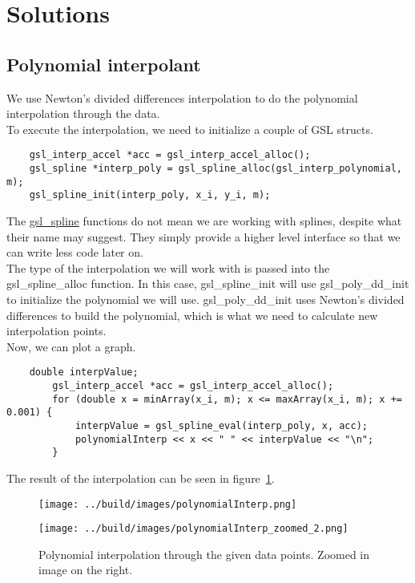 \documentclass[11pt, a4paper, titlepage, openright]{article}
\begin{document}
\section{Solutions}

\subsection{Polynomial interpolant}
\label{sec:firstpoly}
    We use Newton's divided differences interpolation to do the polynomial interpolation through the data. \\

    To execute the interpolation, we need to initialize a couple of GSL structs.
    \begin{lstlisting}
    gsl_interp_accel *acc = gsl_interp_accel_alloc();
    gsl_spline *interp_poly = gsl_spline_alloc(gsl_interp_polynomial, m);
    gsl_spline_init(interp_poly, x_i, y_i, m);
    \end{lstlisting}
    The \href{https://www.gnu.org/software/gsl/manual/html_node/1D-Higher_002dlevel-Interface.html#g_t1D-Higher_002dlevel-Interface}
    {gsl\_spline} functions do not mean we are working with splines, despite what their name may suggest.
    They simply provide a higher level interface so that we can write less code later on. \\ The type of the interpolation
    we will work with is passed into the gsl\_spline\_alloc function. In this case, gsl\_spline\_init  will
    use gsl\_poly\_dd\_init to initialize the polynomial we will use. gsl\_poly\_dd\_init uses Newton's divided differences to build the polynomial,
    which is what we need to calculate new interpolation points. \\

    Now, we can plot a graph.
    \begin{lstlisting}
    double interpValue;
        gsl_interp_accel *acc = gsl_interp_accel_alloc();
        for (double x = minArray(x_i, m); x <= maxArray(x_i, m); x += 0.001) {
            interpValue = gsl_spline_eval(interp_poly, x, acc);
            polynomialInterp << x << " " << interpValue << "\n";
        }
    \end{lstlisting}
    The result of the interpolation can be seen in figure~\ref{fig:poly1}.


    \begin{figure}[H]
        \begin{minipage}[b]{0.49\textwidth}
            \texttt{[image: ../build/images/polynomialInterp.png]}
        \end{minipage}
        \hfill
        \begin{minipage}[b]{0.49\textwidth}
            \texttt{[image: ../build/images/polynomialInterp\_zoomed\_2.png]}
        \end{minipage}
        \caption{Polynomial interpolation through the given data points. Zoomed in image on the right.}
        \label{fig:poly1}
    \end{figure}
\end{document}
